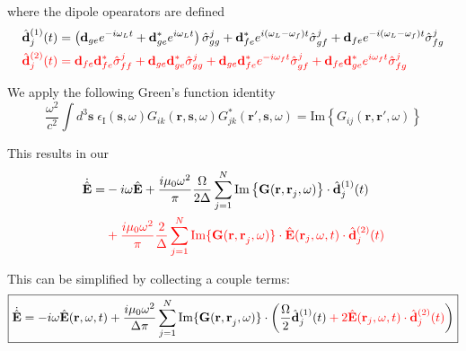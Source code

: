 \documentclass[a4paper, 11pt]{article}
\numberwithin{equation}{section}
\begin{document}
where the dipole opearators are defined
\begin{align}
  \hat{\mathbf{d}}^{(1)}_j(t) &= \left(\mathbf{d}_{ge}e^{-i\omega_Lt} +
  \mathbf{d}_{ge}^*e^{i\omega_Lt}\right) \hat{\sigma}_{gg}^j
  + \mathbf{d}_{fe}^*e^{i(\omega_L-\omega_f)t}\hat{\sigma}_{gf}^j+
  \mathbf{d}_{fe}e^{-i(\omega_L-\omega_f)t}\hat{\sigma}_{fg}^j\\\color{red}
  \hat{\mathbf{d}}^{(2)}_j(t) &\color{red}= \mathbf{d}_{fe}
  \mathbf{d}_{fe}^*\hat\sigma_{ff}^j + \mathbf{d}_{ge}
  \mathbf{d}_{ge}^*\hat\sigma_{gg}^j +\mathbf{d}_{ge}
  \mathbf{d}_{fe}^*e^{-i\omega_ft}\hat\sigma_{gf}^j + \mathbf{d}_{fe}
  \mathbf{d}_{ge}^*e^{i\omega_ft}\hat\sigma_{fg}^j
\end{align}

We apply the following Green's function identity
\begin{equation}
  \frac{\omega^2}{c^2}\int d^3\mathbf{s}\; \epsilon_{\text{I}}(\mathbf{s}, \omega)
  G_{ik}(\mathbf{r,s}, \omega)G_{jk}^* (\mathbf{r',s}, \omega) = \text{Im}
  \left\{G_{ij}(\mathbf{r,r'}, \omega)\right\}
\end{equation}

This results in our 
\begin{equation}\label{Edot}
\begin{aligned}
  \dot{\hat{\mathbf{E}}} = &-i\omega\hat{\mathbf{E}}+
  \frac{i\mu_0\omega^2}{\pi} \frac{\Omega}{2\Delta} \sum_{j=1}^N \text{Im}\left\{
  \mathbf{G}(\mathbf{r, r}_j, \omega) \right\} \cdot \hat{\mathbf{d}}^{(1)}_j(t)\\ &\color{red}+
  \frac{i\mu_0\omega^2}{\pi}\frac{2}{\Delta} \sum_{j=1}^N \text{Im}\{ \mathbf{G(r,
  r}_j, \omega) \} \cdot \hat{\mathbf{E}}(\mathbf{r}_j, \omega, t)\cdot
  \hat{\mathbf{d}}_{j}^{(2)}(t)
\end{aligned}
\end{equation}

This can be simplified by collecting a couple terms:
\begin{equation}\label{Edott}\boxed{
\begin{aligned}
  \dot{\hat{\mathbf{E}}} = -i\omega\hat{\mathbf{E}}(\mathbf{r},\omega, t)+\frac{i\mu_0\omega^2}{\Delta\pi}\sum_{j=1}^N \text{Im}\{ \mathbf{G(r, r}_j,
  \omega) \} \cdot \left( \frac{\Omega}{2}\hat{\mathbf{d}}_j^{(1)}(t)\color{red} + 2
  \hat{\mathbf{E}}(\mathbf{r}_j, \omega, t)\cdot
\hat{\mathbf{d}}^{(2)}_j(t)\color{black} \right)
\end{aligned}}
\end{equation}
\end{document}
